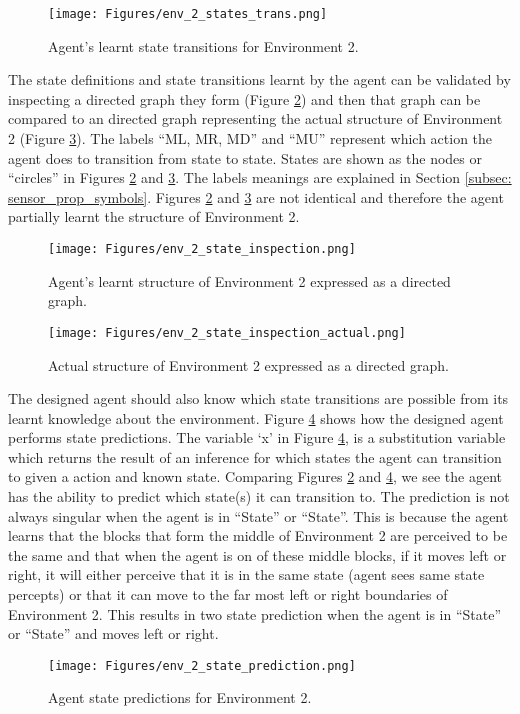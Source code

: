 \begin{figure}[H]
    \centering
    \texttt{[image: Figures/env\_2\_states\_trans.png]}
    \caption{Agent's learnt state transitions for Environment 2.}
    \label{fig:env_2_state_def_transitions}
\end{figure}


The state definitions and state transitions learnt by the agent can be validated by inspecting a directed graph they form (Figure \ref{fig:env_2_learnt}) and then that graph can be compared to an directed graph representing the actual structure of Environment 2 (Figure \ref{fig:env_2_actual}). The labels ``ML, MR, MD'' and ``MU'' represent which action the agent does to transition from state to state. States  are shown as the nodes or ``circles'' in Figures \ref{fig:env_2_learnt} and \ref{fig:env_2_actual}. The labels meanings are explained in Section \ref{subsec: sensor_prop_symbols}. Figures \ref{fig:env_2_learnt} and \ref{fig:env_2_actual} are not identical and therefore the agent partially learnt the structure of Environment 2.

\begin{figure}[H]
    \centering
    \texttt{[image: Figures/env\_2\_state\_inspection.png]}
    \caption{Agent's learnt structure of Environment 2 expressed as a directed graph.}
    \label{fig:env_2_learnt}
\end{figure}

\begin{figure}[H]
    \centering
    \texttt{[image: Figures/env\_2\_state\_inspection\_actual.png]}
    \caption{Actual structure of Environment 2 expressed as a directed graph.}
    \label{fig:env_2_actual}
\end{figure}

The designed agent should also know which state transitions are possible from its learnt knowledge about the environment. Figure \ref{fig:env_2_predict} shows how the designed agent performs state predictions. The variable `x' in Figure \ref{fig:env_2_predict}, is a substitution variable which returns the result of an inference for which states the agent can transition to given a action and known state. Comparing Figures \ref{fig:env_2_learnt} and \ref{fig:env_2_predict}, we see the agent has the ability to predict which state(s) it can transition to. The prediction is not always singular when the agent is in ``State'' or ``State''. This is because the agent learns that the blocks that form the middle of Environment 2 are perceived to be the same and that when the agent is on of these middle blocks, if it moves left or right, it will either perceive that it is in the same state (agent sees same state percepts) or that it can move to the far most left or right boundaries of Environment 2. 
This results in two state prediction when the agent is in ``State'' or ``State'' and moves left or right. 	

\begin{figure}[H]
    \centering
    \texttt{[image: Figures/env\_2\_state\_prediction.png]}
    \caption{Agent state predictions for Environment 2.}
    \label{fig:env_2_predict}
\end{figure}


